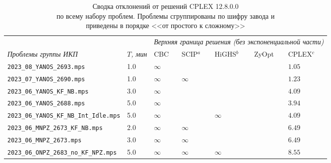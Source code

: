 \documentclass[%
	11pt,
	a4paper,
	utf8,
		]{article}
\begin{document}
\begin{landscape}
{%
	\begin{table}[!h]
		\centering
		\caption{Сводка отклонений от решений CPLEX 12.8.0.0\\ по всему набору проблем. Проблемы сгруппированы по шифру завода и \\приведены в порядке <<от простого к сложному>>}
		
		\begin{tabular}{ p{} | p{1.4cm} | p{0.7cm} | p{2.3cm} | p{2.5cm} | p{2.7cm} | p{1.4cm} }
			{} & {} & \multicolumn{5}{c}{\emph{Верхняя граница решения (без экспоненциальной части)}}\\[2mm]
			\emph{Проблемы группы ИКП} & $ T $\emph{, мин} & CBC & SCIP$^a $ & HiGHS$ ^b $ & ZyOpt & CPLEX$ ^c $ \\
			\hline\hline
			\rowcolor{blue!3}\texttt{2023\_08\_YANOS\_2693.mps} & 1.0 & $ \infty $ & \ccb{$ 1.05 (-0.16\%) $} & \ccb{ $ 1.05 (-0.07\%) $ } & \ccb{ $ 1.05 (-0.10\%) $ } & $ 1.05 $ \\
			\rowcolor{black!5}\texttt{2023\_07\_YANOS\_2690.mps} & 1.0 & $ \infty $ & $ \infty $ & \ccb{$ 1.23 (-0.08\%) $} & \ccg{ $ 1.23 (+0.01\%) $ } & $ 1.23 $ \\
			\rowcolor{blue!3}\texttt{2023\_06\_YANOS\_KF\_NB.mps} & 3.0 & $ \infty $ & \ccb{$ 4.16 (-1.92\%) $} & \ccb{ $ 4.17 (-1.98\%) $ } & \ccb{ $ 4.13 (-1.22\%) $ } & $ 4.09 $ \\
			\rowcolor{black!5}\texttt{2023\_06\_YANOS\_2688.mps} & 5.0 & $ \infty $ & \ccb{ $ 3.96 (-0.47\%) $} & \ccb{ $ 3.96 (-0.56\%) $ } & \ccb{ $ 3.99 (-1.33\%) $ } & $ 3.94 $\\
			\rowcolor{blue!3}\texttt{2023\_06\_YANOS\_KF\_NB\_Int\_Idle.mps} & 5.0 & $ \infty $ & \ccb{ $ 4.17 (-1.92\%) $ } & $ \infty $ & \ccb{ $ 4.20 (-2.52\%) $ } & $ 4.09 $ \\
			\noalign{\smallskip} 
			\rowcolor{black!5}\texttt{2023\_06\_MNPZ\_2673\_KF\_NB.mps} & 2.0 & $ \infty $ & $ \infty $ & \ccb{ $ 6.66 (-2.71\%) $ } & \ccb{ $ 6.68 (-2.91\%) $ } & $ 6.49 $ \\
			\rowcolor{blue!3}\texttt{2023\_06\_MNPZ\_2673.mps} & 3.0 & $ \infty $ &  $ \infty $ & \ccb{ $ 6.53 (-0.58\%) $ } & \ccb{ $ 6.61 (-1.82\%) $ } & $ 6.49 $ \\
			\noalign{\smallskip} 
			\rowcolor{black!5}\texttt{2023\_06\_ONPZ\_2683\_no\_KF\_NPZ.mps} & 5.0 & $ \infty $ & $ \infty $ & $ \infty $ & \ccg{$ 7.67 (+10.35\%) $} & $ 8.55 $\\

\end{tabular}
\end{table}}
\end{landscape}
\end{document}
